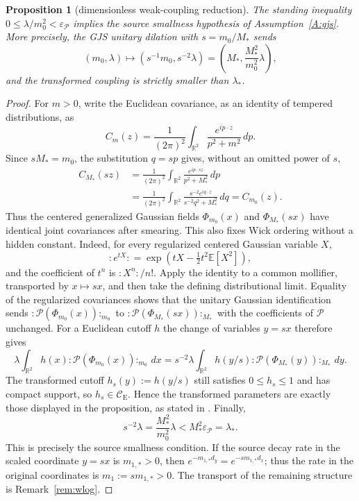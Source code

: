 \documentclass[11pt,a4paper]{article}
\theoremstyle{plain}
\newtheorem{proposition}[theorem]{Proposition}
\theoremstyle{definition}
\theoremstyle{plain}
\theoremstyle{definition}
\newcommand{\R}{\mathbb{R}}
\newcommand{\E}{\mathbb{E}}
\newcommand{\CE}{\mathcal{C}_{\mathrm E}}
\begin{document}
\begin{proposition}[dimensionless weak-coupling reduction]\label{prop:scaling}
The standing inequality $0\le\lambda/m_0^2<\varepsilon_{\mathscr P}$ implies the source
smallness hypothesis of Assumption~\ref{A:gjs}. More precisely, the GJS unitary dilation
with $s=m_0/M_*$ sends
\[
  (m_0,\lambda)\longmapsto
  (s^{-1}m_0,s^{-2}\lambda)
  =\left(M_*,\frac{M_*^2}{m_0^2}\lambda\right),
\]
and the transformed coupling is strictly smaller than $\lambda_*$.
\end{proposition}

\begin{proof}
For $m>0$, write the Euclidean covariance, as an identity of tempered distributions, as
\[
  C_m(z)=\frac1{(2\pi)^2}\int_{\R^2}\frac{e^{ip\cdot z}}{p^2+m^2}\,dp .
\]
Since $sM_*=m_0$, the substitution $q=sp$ gives, without an omitted power of $s$,
\begin{align*}
  C_{M_*}(sz)
  &=\frac1{(2\pi)^2}\int_{\R^2}
      \frac{e^{ip\cdot sz}}{p^2+M_*^2}\,dp \\
  &=\frac1{(2\pi)^2}\int_{\R^2}
      \frac{s^{-2}e^{iq\cdot z}}{s^{-2}q^2+M_*^2}\,dq
    =C_{m_0}(z).
\end{align*}
Thus the centered generalized Gaussian fields $\Phi_{m_0}(x)$ and $\Phi_{M_*}(sx)$ have
identical joint covariances after smearing. This also fixes Wick ordering without a hidden
constant. Indeed, for every regularized centered Gaussian variable $X$,
\[
 {:}e^{tX}{:}=\exp\!\left(tX-\tfrac12t^2\E[X^2]\right),
\]
and the coefficient of $t^n$ is ${:}X^n{:}/n!$. Apply the identity to a common mollifier,
transported by $x\mapsto sx$, and then take the defining distributional limit. Equality of
the regularized covariances shows that the unitary Gaussian identification sends
${:}\mathscr P(\Phi_{m_0}(x)){:}_{m_0}$ to
${:}\mathscr P(\Phi_{M_*}(sx)){:}_{M_*}$ with the coefficients of $\mathscr P$ unchanged.
For a Euclidean cutoff $h$ the change of variables $y=sx$ therefore gives
\[
 \lambda\int_{\R^2}h(x){:}\mathscr P(\Phi_{m_0}(x)){:}_{m_0}\,dx
 =s^{-2}\lambda\int_{\R^2}h(y/s){:}\mathscr P(\Phi_{M_*}(y)){:}_{M_*}\,dy .
\]
The transformed cutoff $h_s(y):=h(y/s)$ still satisfies $0\le h_s\le1$ and has compact
support, so $h_s\in\CE$. Hence the transformed parameters are exactly those displayed in
the proposition, as stated in \cite[p.~590]{GJS}. Finally,
\[
 s^{-2}\lambda=\frac{M_*^2}{m_0^2}\lambda
 <M_*^2\varepsilon_{\mathscr P}=\lambda_* .
\]
This is precisely the source smallness condition. If the source decay rate in the scaled
coordinate $y=sx$ is $m_{1,*}>0$, then
$e^{-m_{1,*}d_y}=e^{-sm_{1,*}d_x}$; thus the rate in the original coordinates is
$m_1:=sm_{1,*}>0$. The transport of the remaining structure is
Remark~\ref{rem:wlog}.
\end{proof}
\end{document}
